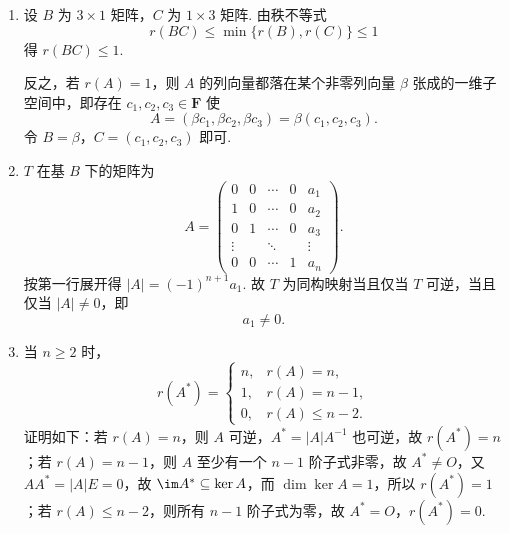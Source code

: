\begin{enumerate}
\begin{enumerate}
        又 $PAQ=0\iff P\alpha_2=0$，解得 $\alpha_2 = k(0,0,1)^\mathrm{T}, k \in \mathbf{R}$，于是
        \[
            \ker\sigma
            =\left\{\begin{pmatrix}a&0\\b&0\\c&d\end{pmatrix}\,\middle|\,a,b,c,d\in\mathbf{R}\right\},
        \]
        维数为 $4$.

        \item $\dim\mathbf{R}^{3\times 2}=6$，且 $\dim\im\sigma+\dim\ker\sigma=2+4=6$，维数公式成立.
    \end{enumerate}

    \item 设 $B$ 为 $3\times 1$ 矩阵，$C$ 为 $1\times 3$ 矩阵. 由秩不等式
    \[
        r(BC)\leqslant\min\{r(B),r(C)\}\leqslant 1
    \]
    得 $r(BC)\leqslant 1$.

    反之，若 $r(A)=1$，则 $A$ 的列向量都落在某个非零列向量 $\beta$ 张成的一维子空间中，即存在 $c_1,c_2,c_3\in\mathbf F$ 使
    \[
        A=(\beta c_1,\beta c_2,\beta c_3)=\beta(c_1,c_2,c_3).
    \]
    令 $B=\beta$，$C=(c_1,c_2,c_3)$ 即可.

    \item $T$ 在基 $B$ 下的矩阵为
    \[
        A=\begin{pmatrix}
            0&0&\cdots&0&a_1\\
            1&0&\cdots&0&a_2\\
            0&1&\cdots&0&a_3\\
            \vdots&&\ddots&&\vdots\\
            0&0&\cdots&1&a_n
        \end{pmatrix}.
    \]
    按第一行展开得 $|A|=(-1)^{n+1}a_1$. 故 $T$ 为同构映射当且仅当 $T$ 可逆，当且仅当 $|A|\neq 0$，即
    \[
        a_1\neq 0.
    \]

    \item 当 $n\geqslant 2$ 时，
    \[
        r(A^*)=
        \begin{cases}
            n,&r(A)=n,\\
            1,&r(A)=n-1,\\
            0,&r(A)\leqslant n-2.
        \end{cases}
    \]
    证明如下：若 $r(A)=n$，则 $A$ 可逆，$A^*=|A|A^{-1}$ 也可逆，故 $r(A^*)=n$；若 $r(A)=n-1$，则 $A$ 至少有一个 $n-1$ 阶子式非零，故 $A^*\neq O$，又 $AA^*=|A|E=0$，故 $\im A^*\subseteq\ker A$，而 $\dim\ker A=1$，所以 $r(A^*)=1$；若 $r(A)\leqslant n-2$，则所有 $n-1$ 阶子式为零，故 $A^*=O$，$r(A^*)=0$.


\end{enumerate}
